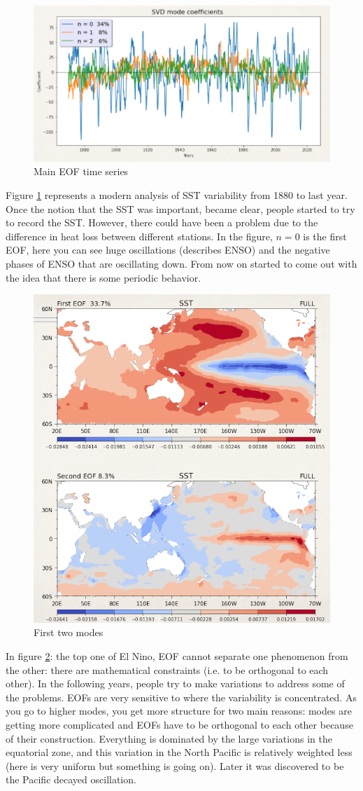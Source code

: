 \begin{figure}[h!]
    \centering
    \includegraphics[width=0.5\linewidth]{uploads/Screenshot 2024-11-18 164205.png}
    \caption{Main EOF time series}
    \label{fig:eof time series}
\end{figure}
Figure \ref{fig:eof time series} represents a modern analysis of SST variability from 1880 to last year. Once the notion that the SST was important, became clear, people started to try to record the SST. However, there could have been a problem due to the difference in heat loss between different stations. In the figure, $n=0$ is the first EOF, here you can see huge oscillations (describes ENSO) and the negative phases of ENSO that are oscillating down. From now on started to come out with the idea that there is some periodic behavior. 
\begin{figure}[h!]
    \centering
    \includegraphics[width=0.5\linewidth]{uploads/Screenshot 2024-11-18 164916.png}
    \caption{First two modes}
    \label{fig:first two modes}
\end{figure}
In figure \ref{fig:first two modes}: the top one of El Nino, EOF cannot separate one phenomenon from the other: there are mathematical constraints (i.e. to be orthogonal to each other). In the following  years, people try to make variations to address some of the problems. EOFs are very sensitive to where the variability is concentrated. As you go to higher modes, you get more structure for two main reasons: modes are getting more complicated and EOFs have to be orthogonal to each other because of their construction. Everything is dominated by the large variations in the equatorial zone, and this variation in the North Pacific is relatively weighted less (here is very uniform but something is going on). Later it was discovered to be the Pacific decayed oscillation. 

